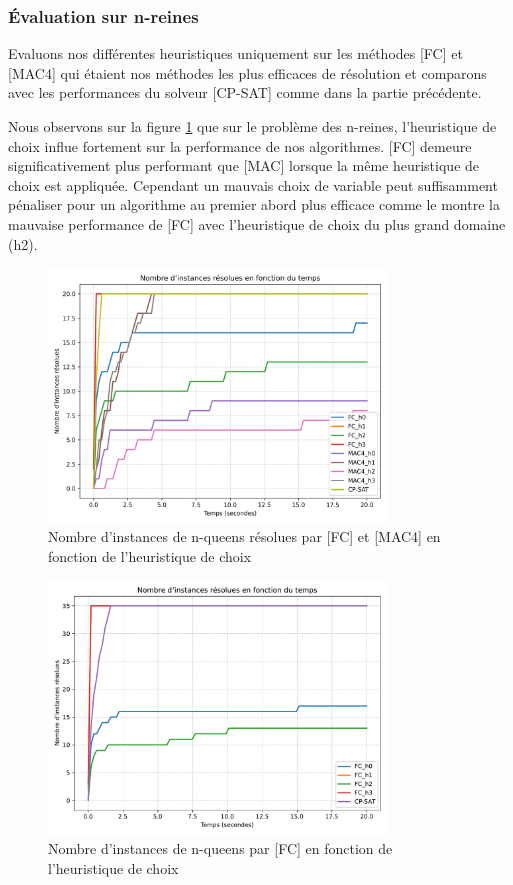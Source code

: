 \documentclass[14pt]{article}
\begin{document}
\subsubsection{Évaluation sur n-reines}

Evaluons nos différentes heuristiques uniquement sur les méthodes [FC] et [MAC4] qui étaient nos méthodes les plus efficaces de résolution et comparons avec les performances du solveur [CP-SAT] comme dans la partie précédente.

Nous observons sur la figure \ref{fig:n-queens-h1} que sur le problème des n-reines, l'heuristique de choix influe fortement sur la performance de nos algorithmes. [FC] demeure significativement plus performant que [MAC] lorsque la même heuristique de choix est appliquée. Cependant un mauvais choix de variable peut suffisamment pénaliser pour un algorithme au premier abord plus efficace comme le montre la mauvaise performance de [FC] avec l'heuristique de choix du plus grand domaine (h2).

\begin{figure}[H]
    \centering
    \includegraphics[width=0.8\textwidth]{Images/n-queens-h-MAC-FC.png}
    \caption{Nombre d'instances de n-queens résolues par [FC] et [MAC4] en fonction de l'heuristique de choix}
    \label{fig:n-queens-h1}
\end{figure}

\begin{figure}[H]
    \centering
    \includegraphics[width=0.8\textwidth]{Images/n-queens-h-FC.pdf}
    \caption{Nombre d'instances de n-queens par [FC] en fonction de l'heuristique de choix}
    \label{fig:n-queens-h2}
\end{figure}
\end{document}
